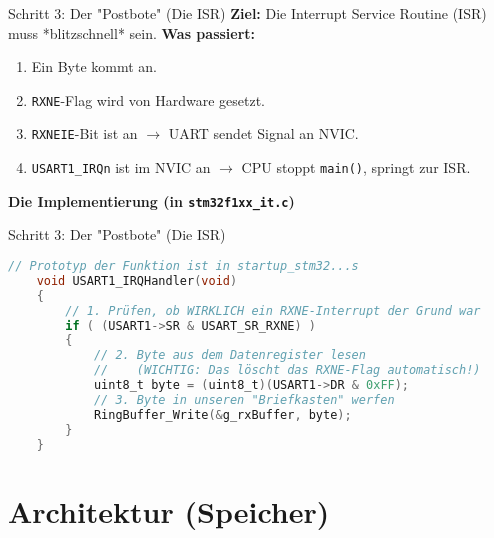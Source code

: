 \documentclass{beamer}
\begin{document}
\begin{frame}{Schritt 3: Der "Postbote" (Die ISR)}
	\textbf{Ziel:} Die Interrupt Service Routine (ISR) muss *blitzschnell* sein.
	\textbf{Was passiert:}
	\begin{enumerate}
		\item Ein Byte kommt an.
		\item \texttt{RXNE}-Flag wird von Hardware gesetzt.
		\item \texttt{RXNEIE}-Bit ist an $\rightarrow$ UART sendet Signal an NVIC.
		\item \texttt{USART1\_IRQn} ist im NVIC an $\rightarrow$ CPU stoppt \texttt{main()}, springt zur ISR.
	\end{enumerate}
	\textbf{Die Implementierung (in \texttt{stm32f1xx\_it.c})}
\end{frame}
\begin{frame}[fragile]{Schritt 3: Der "Postbote" (Die ISR)}
	\begin{lstlisting}[language=C, style=mystyle]
	// Prototyp der Funktion ist in startup_stm32...s
	void USART1_IRQHandler(void)
	{
		// 1. Prüfen, ob WIRKLICH ein RXNE-Interrupt der Grund war
		if ( (USART1->SR & USART_SR_RXNE) )
		{
			// 2. Byte aus dem Datenregister lesen
			//    (WICHTIG: Das löscht das RXNE-Flag automatisch!)
			uint8_t byte = (uint8_t)(USART1->DR & 0xFF);
			// 3. Byte in unseren "Briefkasten" werfen
			RingBuffer_Write(&g_rxBuffer, byte);
		}
	}
\end{lstlisting}
\end{frame}
\section{Architektur (Speicher)}
\end{document}

